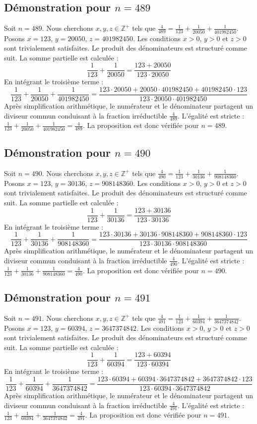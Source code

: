 \documentclass[11pt,a4paper]{article}
\begin{document}
\subsection{Démonstration pour $n = 489$}
Soit $n = 489$. Nous cherchons $x, y, z \in \mathbb{Z}^{+}$ tels que $\frac{4}{489} = \frac{1}{123} + \frac{1}{20050} + \frac{1}{401982450}$.
Posons $x = 123$, $y = 20050$, $z = 401982450$.
Les conditions $x > 0$, $y > 0$ et $z > 0$ sont trivialement satisfaites.
Le produit des dénominateurs est structuré comme suit. La somme partielle est calculée :
$$ \frac{1}{123} + \frac{1}{20050} = \frac{123+20050}{123 \cdot 20050} $$
En intégrant le troisième terme :
$$ \frac{1}{123} + \frac{1}{20050} + \frac{1}{401982450} = \frac{123 \cdot 20050 + 20050 \cdot 401982450 + 401982450 \cdot 123}{123 \cdot 20050 \cdot 401982450} $$
Après simplification arithmétique, le numérateur et le dénominateur partagent un diviseur commun conduisant à la fraction irréductible $\frac{4}{489}$.
L'égalité est stricte : $\frac{1}{123} + \frac{1}{20050} + \frac{1}{401982450} = \frac{4}{489}$.
La proposition est donc vérifiée pour $n = 489$.
\subsection{Démonstration pour $n = 490$}
Soit $n = 490$. Nous cherchons $x, y, z \in \mathbb{Z}^{+}$ tels que $\frac{4}{490} = \frac{1}{123} + \frac{1}{30136} + \frac{1}{908148360}$.
Posons $x = 123$, $y = 30136$, $z = 908148360$.
Les conditions $x > 0$, $y > 0$ et $z > 0$ sont trivialement satisfaites.
Le produit des dénominateurs est structuré comme suit. La somme partielle est calculée :
$$ \frac{1}{123} + \frac{1}{30136} = \frac{123+30136}{123 \cdot 30136} $$
En intégrant le troisième terme :
$$ \frac{1}{123} + \frac{1}{30136} + \frac{1}{908148360} = \frac{123 \cdot 30136 + 30136 \cdot 908148360 + 908148360 \cdot 123}{123 \cdot 30136 \cdot 908148360} $$
Après simplification arithmétique, le numérateur et le dénominateur partagent un diviseur commun conduisant à la fraction irréductible $\frac{4}{490}$.
L'égalité est stricte : $\frac{1}{123} + \frac{1}{30136} + \frac{1}{908148360} = \frac{4}{490}$.
La proposition est donc vérifiée pour $n = 490$.
\subsection{Démonstration pour $n = 491$}
Soit $n = 491$. Nous cherchons $x, y, z \in \mathbb{Z}^{+}$ tels que $\frac{4}{491} = \frac{1}{123} + \frac{1}{60394} + \frac{1}{3647374842}$.
Posons $x = 123$, $y = 60394$, $z = 3647374842$.
Les conditions $x > 0$, $y > 0$ et $z > 0$ sont trivialement satisfaites.
Le produit des dénominateurs est structuré comme suit. La somme partielle est calculée :
$$ \frac{1}{123} + \frac{1}{60394} = \frac{123+60394}{123 \cdot 60394} $$
En intégrant le troisième terme :
$$ \frac{1}{123} + \frac{1}{60394} + \frac{1}{3647374842} = \frac{123 \cdot 60394 + 60394 \cdot 3647374842 + 3647374842 \cdot 123}{123 \cdot 60394 \cdot 3647374842} $$
Après simplification arithmétique, le numérateur et le dénominateur partagent un diviseur commun conduisant à la fraction irréductible $\frac{4}{491}$.
L'égalité est stricte : $\frac{1}{123} + \frac{1}{60394} + \frac{1}{3647374842} = \frac{4}{491}$.
La proposition est donc vérifiée pour $n = 491$.
\end{document}
